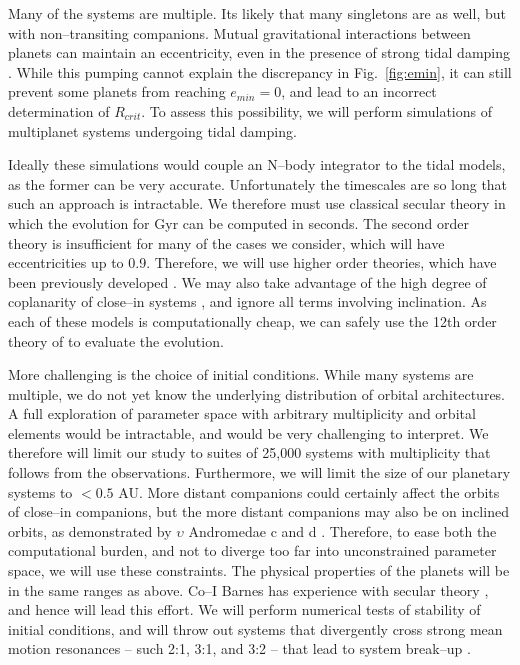 Many of the \kepler systems are multiple.  Its likely that many
singletons are as well, but with non--transiting companions.  Mutual
gravitational interactions between planets can maintain an
eccentricity, even in the presence of strong tidal damping
\citep{MardlingLin02,GreenbergVanLaerhoven11,Correia12}.  While this
pumping cannot explain the discrepancy in Fig.~\ref{fig:emin}, it can
still prevent some planets from reaching $e_{min} = 0$, and lead to an
incorrect determination of $R_{crit}$.  To assess this possibility, we
will perform simulations of multiplanet systems undergoing tidal
damping.

Ideally these simulations would couple an N--body integrator to the
tidal models, as the former can be very accurate.  Unfortunately the
timescales are so long that such an approach is intractable.  We
therefore must use classical secular theory in which the evolution for
Gyr can be computed in seconds.  The second order theory is
insufficient for many of the cases we consider, which will have
eccentricities up to 0.9.  Therefore, we will use higher order
theories, which have been previously developed
\citep[e.g.][]{Ford00,VerasArmitage04,LibertHenrard06}.  We may also
take advantage of the high degree of coplanarity of close--in
\kepler systems \cite{Fabrycky12}, and ignore all terms involving
inclination.  As each of these models is computationally cheap, we can
safely use the 12th order theory of \cite{LibertHenrard} to evaluate
the evolution.  

More challenging is the choice of initial conditions.  While many
\kepler systems are multiple, we do not yet know the underlying
distribution of orbital architectures.  A full exploration of
parameter space with arbitrary multiplicity and orbital elements would
be intractable, and would be very challenging to interpret.  We
therefore will limit our study to suites of 25,000 systems with
multiplicity that follows from the observations.  Furthermore, we will
limit the size of our planetary systems to $<0.5$ AU.  More distant
companions could certainly affect the orbits of close--in companions,
but the more distant companions may also be on inclined orbits, as
demonstrated by $\upsilon$ Andromedae c and d
\citep{McArthur10,ReffertQuirrenbach11}.  Therefore, to ease both the
computational burden, and not to diverge too far into unconstrained
parameter space, we will use these constraints.  The physical
properties of the planets will be in the same ranges as above.  Co--I
Barnes has experience with secular theory
\citep{BarnesGreenberg06a,BarnesGreenberg06b}, and hence will lead
this effort.  We will perform numerical tests of stability of initial
conditions, and will throw out systems that divergently cross strong
mean motion resonances -- such 2:1, 3:1, and 3:2 -- that lead to
system break--up \citep[e.g.][]{Gomes05}.

